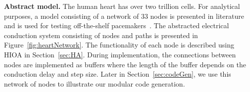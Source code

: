 \noindent \textbf{Abstract model.} The human heart has over two trillion
cells. For analytical purposes, a model consisting of a network of $33$
nodes is presented in literature and is used for testing off-the-shelf
pacemakers~\cite{zhihao12,chen14}. The abstracted electrical conduction
system consisting of nodes and paths is presented in
Figure~\ref{fig:heartNetwork}. The functionality of each node is
described using \acf{HIOA} in Section~\ref{sec:HA}.  During implementation, the 
connections between nodes are implemented as buffers where the length of the 
buffer depends on the conduction delay and step size.  Later in 
Section~\ref{sec:codeGen}, we use this network of nodes to illustrate our 
modular code generation.



